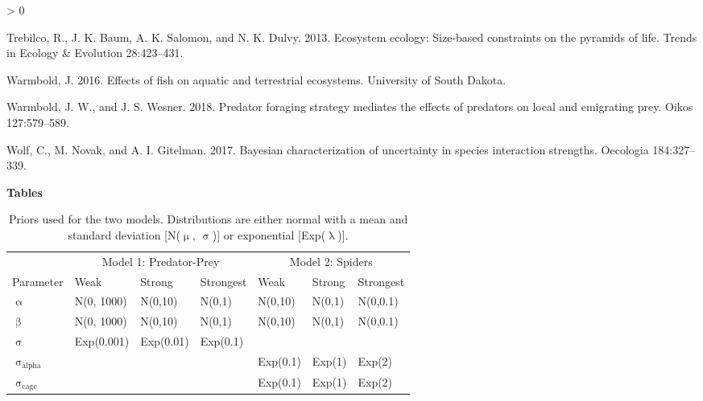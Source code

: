 \documentclass[
  12pt,
]{article}
\newlength{\cslhangindent}
\newenvironment{CSLReferences}[2] %
 {%
  \setlength{\parindent}{0pt}
  \ifodd #1 \everypar{\setlength{\hangindent}{\cslhangindent}}\ignorespaces\fi
  \ifnum #2 > 0
  \setlength{\parskip}{#2\baselineskip}
  \fi
 }%
 {}
\begin{document}
\begin{CSLReferences}{1}{0}
\leavevmode\hypertarget{ref-trebilco_ecosystem_2013}{}%
Trebilco, R., J. K. Baum, A. K. Salomon, and N. K. Dulvy. 2013.
Ecosystem ecology: Size-based constraints on the pyramids of life.
Trends in Ecology \& Evolution 28:423--431.

\leavevmode\hypertarget{ref-warmbold_effects_2016}{}%
Warmbold, J. 2016. Effects of fish on aquatic and terrestrial
ecosystems. University of South Dakota.

\leavevmode\hypertarget{ref-warmbold_predator_2018}{}%
Warmbold, J. W., and J. S. Wesner. 2018. Predator foraging strategy
mediates the effects of predators on local and emigrating prey. Oikos
127:579--589.

\leavevmode\hypertarget{ref-wolf_bayesian_2017}{}%
Wolf, C., M. Novak, and A. I. Gitelman. 2017. Bayesian characterization
of uncertainty in species interaction strengths. Oecologia 184:327--339.

\end{CSLReferences}

\newpage
\renewcommand{\arraystretch}{2}

\textbf{Tables}

\begin{table}[!h]

\caption{\label{tab:unnamed-chunk-1}Priors used for the two models. Distributions are either normal with a mean and standard deviation [N($\upmu$, $\upsigma$)] or exponential [Exp($\uplambda$)].}
\centering
\begin{tabular}[t]{lllllll}
\toprule
\multicolumn{1}{c}{ } & \multicolumn{3}{c}{Model 1: Predator-Prey} & \multicolumn{3}{c}{Model 2: Spiders} \\
\cmidrule(l{3pt}r{3pt}){2-4} \cmidrule(l{3pt}r{3pt}){5-7}
Parameter & Weak & Strong & Strongest & Weak & Strong & Strongest\\
\midrule
$\upalpha$ & N(0, 1000) & N(0,10) & N(0,1) & N(0,10) & N(0,1) & N(0,0.1)\\
$\upbeta$ & N(0, 1000) & N(0,10) & N(0,1) & N(0,10) & N(0,1) & N(0,0.1)\\
$\upsigma$ & Exp(0.001) & Exp(0.01) & Exp(0.1) &  &  & \\
$\upsigma_{\mathrm{alpha}}$ &  &  &  & Exp(0.1) & Exp(1) & Exp(2)\\
$\upsigma_{\mathrm{cage}}$ &  &  &  & Exp(0.1) & Exp(1) & Exp(2)\\
\bottomrule
\end{tabular}
\end{table}
\end{document}
